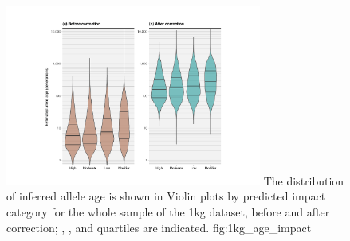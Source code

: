 

\begin{figure}[!htb]
\centering
\includegraphics[width=0.75\textwidth]{./img/ch5/1kg_age_impact}
%
{The distribution of inferred allele age is shown in Violin plots by predicted impact category for the whole sample of the \gls{1kg} dataset, before and after correction; , , and  quartiles are indicated.}%
{fig:1kg_age_impact}
\end{figure}
